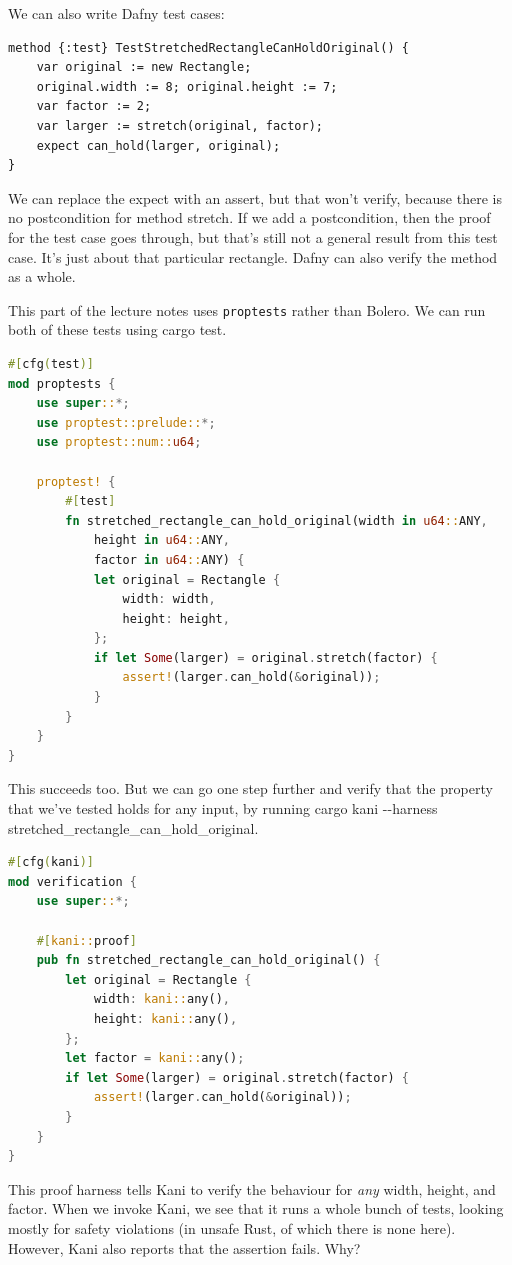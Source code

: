 \documentclass[11pt]{article}
\begin{document}
We can also write Dafny test cases:
\begin{lstlisting}[language=dafny]
method {:test} TestStretchedRectangleCanHoldOriginal() {
    var original := new Rectangle;
    original.width := 8; original.height := 7;
    var factor := 2;
    var larger := stretch(original, factor);
    expect can_hold(larger, original);
}
\end{lstlisting}

We can replace the \textsf{expect} with an \textsf{assert}, but that won't
verify, because there is no postcondition for method \textsf{stretch}.
If we add a postcondition, then the proof for the test case goes through,
but that's still not a general result from this test case. It's just about that particular rectangle.
Dafny can also verify the method as a whole.

This part of the lecture notes uses \texttt{proptests} rather than Bolero. We can run both of these tests using \textsf{cargo test}.
\begin{lstlisting}[language=Rust]
#[cfg(test)]
mod proptests {
    use super::*;
    use proptest::prelude::*;
    use proptest::num::u64;

    proptest! {
        #[test]
        fn stretched_rectangle_can_hold_original(width in u64::ANY,
            height in u64::ANY,
            factor in u64::ANY) {
            let original = Rectangle {
                width: width,
                height: height,
            };
            if let Some(larger) = original.stretch(factor) {
                assert!(larger.can_hold(&original));
            }
        }
    }
}
\end{lstlisting}
This succeeds too. But we can go one step further and verify that the property that we've tested holds for any input, by running
\textsf{cargo kani -{}-harness stretched\_rectangle\_can\_hold\_original}.
\begin{lstlisting}[language=Rust]
#[cfg(kani)]
mod verification {
    use super::*;

    #[kani::proof]
    pub fn stretched_rectangle_can_hold_original() {
        let original = Rectangle {
            width: kani::any(),
            height: kani::any(),
        };
        let factor = kani::any();
        if let Some(larger) = original.stretch(factor) {
            assert!(larger.can_hold(&original));
        }
    }
}
\end{lstlisting}
This proof harness tells Kani to verify the behaviour for \emph{any}
width, height, and factor.  When we invoke Kani, we see that it runs a
whole bunch of tests, looking mostly for safety violations (in unsafe
Rust, of which there is none here).  However, Kani also reports that
the assertion fails. Why?
\end{document}
